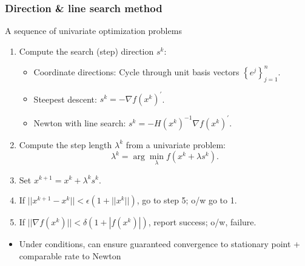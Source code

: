 \documentclass[bigger]{beamer}
\begin{document}
\begin{frame}%

\frametitle{Direction \& line search method}

A sequence of univariate optimization problems

\begin{enumerate}
\item Compute the search (step) direction $s^{k}$:

\begin{itemize}
\item Coordinate directions: Cycle through unit basis vectors $\left\{
e^{j}\right\} _{j=1}^{n}$.

\item Steepest descent: $s^{k}=-\nabla f(x^{k})^{\prime }$.

\item Newton with line search: $s^{k}=-H(x^{k})^{-1}\nabla f(x^{k})^{\prime
} $.
\end{itemize}

\item Compute the step length $\lambda ^{k}$ from a univariate problem: 
\begin{equation*}
\lambda ^{k}=\arg \min_{\lambda }f(x^{k}+\lambda s^{k}).
\end{equation*}

\item Set $x^{k+1}=x^{k}+\lambda ^{k}s^{k}$.

\item If $||x^{k+1}-x^{k}||<\epsilon (1+||x^{k}||)$, go to step 5; o/w go to
1.

\item If $||\nabla f(x^{k})||<\delta (1+|f(x^{k})|)$, report success; o/w,
failure.
\end{enumerate}
\begin{itemize}
\item Under conditions, can ensure guaranteed convergence to stationary point + comparable rate to Newton
\end{itemize}

\end{frame}%
\end{document}

